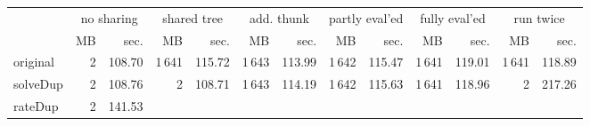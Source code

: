\makeatletter
\begin{tabular}{lrrrrrrrrrrrr}
 \\
& \multicolumn{2}{c}{no sharing}& \multicolumn{2}{c}{shared tree}& \multicolumn{2}{c}{add. thunk}& \multicolumn{2}{c}{partly eval'ed}& \multicolumn{2}{c}{fully eval'ed}& \multicolumn{2}{c}{run twice} \\
& MB & sec.& MB & sec.& MB & sec.& MB & sec.& MB & sec.& MB & sec. \\ \midrule 
original%
&
 {\def\@currentlabel{2}\label{stats:slow:Original:Unshared:mem}2} &
 {\def\@currentlabel{108.70}\label{stats:slow:Original:Unshared:time}108.70}&
 {\def\@currentlabel{1\,641}\label{stats:slow:Original:Shared:mem}1\,641} &
 {\def\@currentlabel{115.72}\label{stats:slow:Original:Shared:time}115.72}&
 {\def\@currentlabel{1\,643}\label{stats:slow:Original:SharedThunk:mem}1\,643} &
 {\def\@currentlabel{113.99}\label{stats:slow:Original:SharedThunk:time}113.99}&
 {\def\@currentlabel{1\,642}\label{stats:slow:Original:SharedEvaled:mem}1\,642} &
 {\def\@currentlabel{115.47}\label{stats:slow:Original:SharedEvaled:time}115.47}&
 {\def\@currentlabel{1\,641}\label{stats:slow:Original:SharedFull:mem}1\,641} &
 {\def\@currentlabel{119.01}\label{stats:slow:Original:SharedFull:time}119.01}&
 {\def\@currentlabel{1\,641}\label{stats:slow:Original:RunTwice:mem}1\,641} &
 {\def\@currentlabel{118.89}\label{stats:slow:Original:RunTwice:time}118.89} \\
\textsf{solveDup}%
&
 {\def\@currentlabel{2}\label{stats:slow:SolveDup:Unshared:mem}2} &
 {\def\@currentlabel{108.76}\label{stats:slow:SolveDup:Unshared:time}108.76}&
 {\def\@currentlabel{2}\label{stats:slow:SolveDup:Shared:mem}2} &
 {\def\@currentlabel{108.71}\label{stats:slow:SolveDup:Shared:time}108.71}&
 {\def\@currentlabel{1\,643}\label{stats:slow:SolveDup:SharedThunk:mem}1\,643} &
 {\def\@currentlabel{114.19}\label{stats:slow:SolveDup:SharedThunk:time}114.19}&
 {\def\@currentlabel{1\,642}\label{stats:slow:SolveDup:SharedEvaled:mem}1\,642} &
 {\def\@currentlabel{115.63}\label{stats:slow:SolveDup:SharedEvaled:time}115.63}&
 {\def\@currentlabel{1\,641}\label{stats:slow:SolveDup:SharedFull:mem}1\,641} &
 {\def\@currentlabel{118.96}\label{stats:slow:SolveDup:SharedFull:time}118.96}&
 {\def\@currentlabel{2}\label{stats:slow:SolveDup:RunTwice:mem}2} &
 {\def\@currentlabel{217.26}\label{stats:slow:SolveDup:RunTwice:time}217.26} \\
\textsf{rateDup}%
&
 {\def\@currentlabel{2}\label{stats:slow:RateDup:Unshared:mem}2} &
 {\def\@currentlabel{141.53}\label{stats:slow:RateDup:Unshared:time}141.53}&

\end{tabular}

